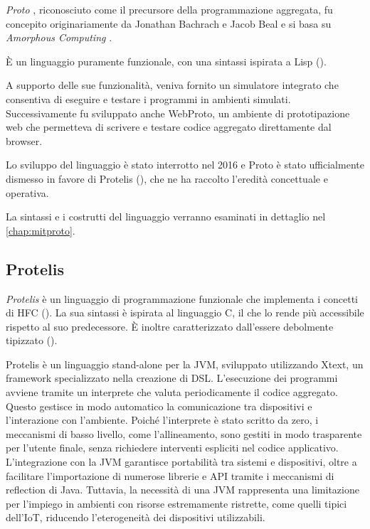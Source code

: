 \emph{Proto} \cite{proto}, riconosciuto come il precursore della programmazione aggregata, fu concepito originariamente da Jonathan Bachrach e Jacob Beal e si basa su \emph{Amorphous Computing} \cite{Amorphous}. 

È un linguaggio puramente funzionale, con una sintassi ispirata a Lisp ().


A supporto delle sue funzionalità, veniva fornito un simulatore integrato che consentiva di eseguire e testare i programmi in ambienti simulati. Successivamente fu sviluppato anche WebProto, un ambiente di prototipazione web che permetteva di scrivere e testare codice aggregato direttamente dal browser.

Lo sviluppo del linguaggio è stato interrotto nel 2016 e Proto è stato ufficialmente dismesso in favore di Protelis \cite{protelis} (), che ne ha raccolto l'eredità concettuale e operativa.

La sintassi e i costrutti del linguaggio verranno esaminati in dettaglio nel \cref{chap:mitproto}.

\subsection{Protelis}
\label{sec:protelis}

\emph{Protelis} \cite{protelis} è un linguaggio di programmazione funzionale che implementa i concetti di \ac{HFC} (). La sua sintassi è ispirata al linguaggio $\text{C}$, il che lo rende più accessibile rispetto al suo predecessore. È inoltre caratterizzato dall'essere debolmente tipizzato ().

Protelis è un linguaggio stand-alone per la \ac{JVM}, sviluppato utilizzando Xtext, un framework specializzato nella creazione di \ac{DSL}.
%
L'esecuzione dei programmi avviene tramite un interprete che valuta periodicamente il codice aggregato. Questo gestisce in modo automatico la comunicazione tra dispositivi e l'interazione con l'ambiente. Poiché l'interprete è stato scritto da zero, i meccanismi di basso livello, come l'allineamento, sono gestiti in modo trasparente per l'utente finale, senza richiedere interventi espliciti nel codice applicativo.
%
L'integrazione con la JVM garantisce portabilità tra sistemi e dispositivi, oltre a facilitare l'importazione di numerose librerie e API tramite i meccanismi di reflection di Java. Tuttavia, la necessità di una JVM rappresenta una limitazione per l'impiego in ambienti con risorse estremamente ristrette, come quelli tipici dell'\ac{IoT}, riducendo l'eterogeneità dei dispositivi utilizzabili.

